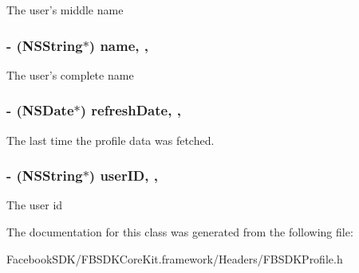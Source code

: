 The user's middle name \hypertarget{interface_f_b_s_d_k_profile_ac9dc573eea0b89119bc6564618cf959f}{
\subsubsection[{name}]{\setlength{\rightskip}{0pt plus 5cm}-\/ (N\-S\-String$\ast$) name\hspace{0.3cm}{\ttfamily [read]}, {\ttfamily [nonatomic]}, {\ttfamily [assign]}}}\label{interface_f_b_s_d_k_profile_ac9dc573eea0b89119bc6564618cf959f}
The user's complete name \hypertarget{interface_f_b_s_d_k_profile_aef99209a7a849699d65189f37d90cfb7}{
\subsubsection[{refresh\-Date}]{\setlength{\rightskip}{0pt plus 5cm}-\/ (N\-S\-Date$\ast$) refresh\-Date\hspace{0.3cm}{\ttfamily [read]}, {\ttfamily [nonatomic]}, {\ttfamily [assign]}}}\label{interface_f_b_s_d_k_profile_aef99209a7a849699d65189f37d90cfb7}
The last time the profile data was fetched. \hypertarget{interface_f_b_s_d_k_profile_a26a7f698acf093c0d7e2be81532d1d67}{
\subsubsection[{user\-I\-D}]{\setlength{\rightskip}{0pt plus 5cm}-\/ (N\-S\-String$\ast$) user\-I\-D\hspace{0.3cm}{\ttfamily [read]}, {\ttfamily [nonatomic]}, {\ttfamily [assign]}}}\label{interface_f_b_s_d_k_profile_a26a7f698acf093c0d7e2be81532d1d67}
The user id 

The documentation for this class was generated from the following file\-:\begin{DoxyCompactItemize}
\item 
Facebook\-S\-D\-K/\-F\-B\-S\-D\-K\-Core\-Kit.\-framework/\-Headers/F\-B\-S\-D\-K\-Profile.\-h\end{DoxyCompactItemize}
